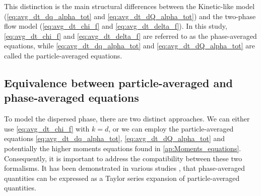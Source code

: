 \documentclass[11pt]{My_preprint}
\providecommand{\DIFdelbegin}{} %
\begin{document}
This distinction is the main structural differences between the Kinetic-like model (\ref{eq:avg_dt_dq_alpha_tot} and \ref{eq:avg_dt_dQ_alpha_tot}) and the two-phase flow model (\ref{eq:avg_dt_chi_f} and \ref{eq:avg_dt_delta_f}). 
In this study, \ref{eq:avg_dt_chi_f} and \ref{eq:avg_dt_delta_f} are referred to as the phase-averaged equations, while \ref{eq:avg_dt_dq_alpha_tot} and \ref{eq:avg_dt_dQ_alpha_tot} are called the particle-averaged equations. 


 



 
\subsection{Equivalence between particle-averaged and phase-averaged equations}
\label{sec:equivalence}
To model the dispersed phase, there are two distinct approaches. 
We can either use \ref{eq:avg_dt_chi_f} with $k=d$, or we can employ the particle-averaged equations \ref{eq:avg_dt_dq_alpha_tot}, \ref{eq:avg_dt_dQ_alpha_tot} and potentially the higher moments equations found in \ref{ap:Moments_equations}.
Consequently, it is important to address the compatibility between these two formalisms.
It has been demonstrated in various studies \citep{buyevich1979flow,lhuillier1992ensemble,jackson1997locally,zhang1994averaged}, that phase-averaged quantities can be expressed as a Taylor series expansion of particle-averaged quantities. 
\DIFdelbegin %
\end{document}
